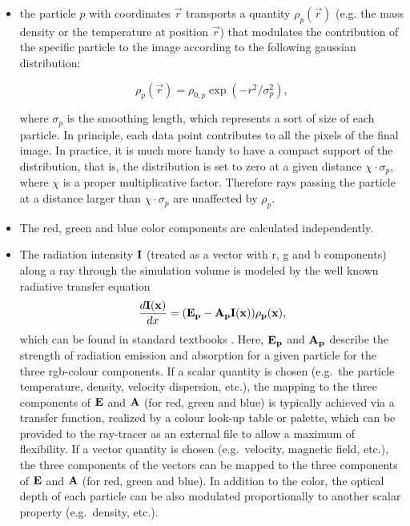\documentclass[11pt]{article}
\begin{document}
\begin{itemize}
\item
the particle $p$ with coordinates $\vec r$ transports a quantity $\rho_p(\vec r)$ 
(e.g. the mass density or the temperature at position $\vec r$)
that modulates the contribution of the specific particle to the image
according to the following gaussian distribution: 

\begin{equation}\label{smooth}
\rho_p(\vec r)=\rho_{0,p}\exp(-r^2/\sigma_p^2),
\end{equation}

where $\sigma_p$ is the smoothing length, which represents
a sort of size of each particle.  
In principle, each data point contributes to all the pixels of the final image.
In practice, it is much more handy to have a compact support of the
distribution, that is, the distribution is set to zero at a given
distance $\chi\cdot\sigma_p$, where $\chi$ is a proper multiplicative factor.
Therefore rays passing
the particle at a distance larger than $\chi\cdot\sigma_p$ are
unaffected by $\rho_p$.

\item
The red, green and blue color components are calculated independently.

\item
The radiation intensity $\bf{I}$ (treated
as a vector with r, g and b components) along a ray through the simulation
volume is modeled by the well known radiative transfer equation
\begin{equation}\label{rad}
\frac{d\bf{I}(x)}{dx}=(\bf{E}_p-\bf{A}_p\bf{I}(x))\rho_p(x),
\end{equation}
which can be found in standard textbooks \cite{1991par..book.....S}.
Here, $\bf{E}_p$ and $\bf{A}_p$ describe the strength of radiation emission and absorption
for a given particle for the three rgb-colour components. 
If a scalar quantity is chosen (e.g.\ the particle temperature,
density, velocity dispersion, etc.), the mapping to the three components of $\bf{E}$ and $\bf{A}$ (for red, green and blue)
is typically achieved via a transfer function, realized by a colour look-up table or palette, which can
be provided to the ray-tracer as an external file to allow a maximum of flexibility. If a
vector quantity is chosen (e.g.\ velocity, magnetic field, etc.), the three components of the vectors
can be mapped to the three components of $\bf{E}$ and $\bf{A}$ (for red, green and blue). 
In addition
to the color, the optical depth of each particle can be also modulated proportionally to another
scalar property (e.g.\ density, etc.).
\end{itemize}
\end{document}
